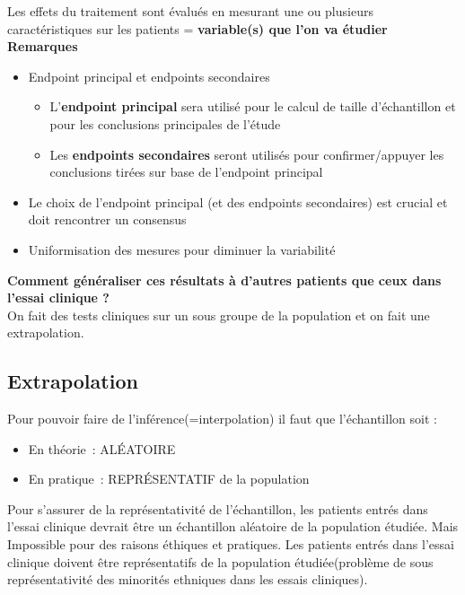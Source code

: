 Les effets du traitement sont évalués en mesurant une ou plusieurs caractéristiques sur les patients = \textbf{variable(s) que l’on va étudier}\\

\textbf{Remarques}\\

\begin{itemize}
    \item Endpoint principal et endpoints secondaires
    \begin{itemize}
        \item  L’\textbf{endpoint principal} sera utilisé pour le calcul de taille
d’échantillon et pour les conclusions principales de l’étude
\item Les \textbf{endpoints secondaires} seront utilisés pour
confirmer/appuyer les conclusions tirées sur base de
l’endpoint principal
    \end{itemize}
\item Le choix de l’endpoint principal (et des endpoints secondaires)
est crucial et doit rencontrer un consensus
\item Uniformisation des mesures pour diminuer la variabilité
\end{itemize}
\vspace{0.15cm}
\textbf{Comment généraliser ces résultats à d’autres patients que ceux dans l’essai clinique ?}\\

On fait des tests cliniques sur un sous groupe de la population et on fait une extrapolation.
\subsection{Extrapolation}
Pour pouvoir faire de l’inférence(=interpolation) il faut que l’échantillon soit :
\begin{itemize}
    \item  En théorie : ALÉATOIRE
    \item En pratique : REPRÉSENTATIF de la population
\end{itemize}
\vspace{0.15cm}
Pour s’assurer de la représentativité de l’échantillon, les patients entrés dans l’essai clinique devrait être un échantillon aléatoire de la population étudiée. Mais Impossible pour des raisons éthiques et pratiques. Les patients entrés dans l’essai clinique doivent être
représentatifs de la population étudiée(problème de sous représentativité des minorités ethniques dans les essais cliniques).\\

